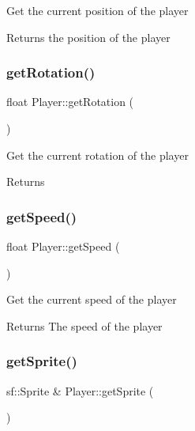 Get the current position of the player 

\begin{DoxyReturn}{Returns}
the position of the player
\end{DoxyReturn}
\mbox{\label{class_player_aa2890f51b31e33f439f6bd67092168f7}} 
\subsubsection{\texorpdfstring{getRotation()}{getRotation()}}
{\footnotesize\ttfamily float Player\+::get\+Rotation (\begin{DoxyParamCaption}{ }\end{DoxyParamCaption})}



Get the current rotation of the player 

\begin{DoxyReturn}{Returns}

\end{DoxyReturn}
\mbox{\label{class_player_a63caffe9c0cbb3b776811ad45a545aa9}} 
\subsubsection{\texorpdfstring{getSpeed()}{getSpeed()}}
{\footnotesize\ttfamily float Player\+::get\+Speed (\begin{DoxyParamCaption}{ }\end{DoxyParamCaption})}



Get the current speed of the player 

\begin{DoxyReturn}{Returns}
The speed of the player
\end{DoxyReturn}
\mbox{\label{class_player_a408134399497e07b0ba53e82d5c40958}} 
\subsubsection{\texorpdfstring{getSprite()}{getSprite()}}
{\footnotesize\ttfamily sf\+::\+Sprite \& Player\+::get\+Sprite (\begin{DoxyParamCaption}{ }\end{DoxyParamCaption})}



